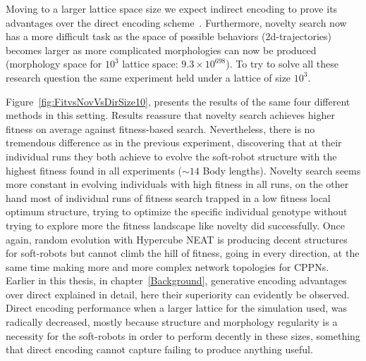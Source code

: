 Moving to a larger lattice space size we expect indirect encoding to prove its advantages over the direct encoding scheme~\citep{cheney2013unshackling,stanley2007compositional}. Furthermore, novelty search now has a more difficult task as the space of possible behaviors (2d-trajectories) becomes larger as more complicated morphologies can now be produced (morphology space for $10^3$ lattice space: $9.3 \times 10^{698}$). To try to solve all these research question the same experiment held under a lattice of size $10^3$. 

Figure~\ref{fig:FitvsNovVsDirSize10}, presents the results of the same four different methods in this setting. Results reassure that novelty search achieves higher fitness on average against fitness-based search. Nevertheless, there is no tremendous difference as in the previous experiment, discovering that at their individual runs they both achieve to evolve the soft-robot structure with the highest fitness found in all experiments ($\sim 14$ Body lengths). Novelty search seems more constant in evolving individuals with high fitness in all runs, on the other hand most of individual runs of fitness search trapped in a low fitness local optimum structure, trying to optimize the specific individual genotype without trying to explore more the fitness landscape like novelty did successfully. Once again, random evolution with Hypercube NEAT is producing decent structures for soft-robots but cannot climb the hill of fitness, going in every direction, at the same time making more and more complex network topologies for CPPNs. Earlier in this thesis, in chapter~\ref{Background}, generative encoding advantages over direct explained in detail, here their superiority can evidently be observed. Direct encoding performance when a larger lattice for the simulation used, was radically decreased, mostly because structure and morphology regularity is a necessity for the soft-robots in order to perform decently in these sizes, something that direct encoding cannot capture failing to produce anything useful.






